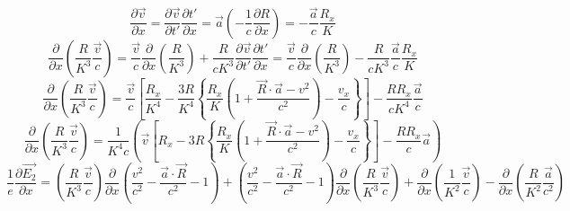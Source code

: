 \documentclass[11pt]{article}
\begin{document}
\[\frac{\partial \overrightarrow{v}}{\partial x}=\frac{\partial \overrightarrow{v}}{\partial t'}\frac{\partial t'}{\partial x}=\overrightarrow{a}\left( -\frac{1}{c}\frac{\partial R}{\partial x} \right)=-\frac{\overrightarrow{a}}{c}\frac{{{R}_{x}}}{K}\]
\[\frac{\partial }{\partial x}\left( \frac{R}{{{K}^{3}}}\frac{\overrightarrow{v}}{c} \right)=\frac{\overrightarrow{v}}{c}\frac{\partial }{\partial x}\left( \frac{R}{{{K}^{3}}} \right)+\frac{R}{c{{K}^{3}}}\frac{\partial \overrightarrow{v}}{\partial t'}\frac{\partial t'}{\partial x}=\frac{\overrightarrow{v}}{c}\frac{\partial }{\partial x}\left( \frac{R}{{{K}^{3}}} \right)-\frac{R}{c{{K}^{3}}}\frac{\overrightarrow{a}}{c}\frac{{{R}_{x}}}{K}\]
\[\frac{\partial }{\partial x}\left( \frac{R}{{{K}^{3}}}\frac{\overrightarrow{v}}{c} \right)=\frac{\overrightarrow{v}}{c}\left[ \frac{{{R}_{x}}}{{{K}^{4}}}-\frac{3R}{{{K}^{4}}}\left\{ \frac{{{R}_{x}}}{K}\left( 1+\frac{\overrightarrow{R}\cdot \overrightarrow{a}-{{v}^{2}}}{{{c}^{2}}} \right)-\frac{{{v}_{x}}}{c} \right\} \right]-\frac{R{{R}_{x}}}{c{{K}^{4}}}\frac{\overrightarrow{a}}{c}\]
\[\frac{\partial }{\partial x}\left( \frac{R}{{{K}^{3}}}\frac{\overrightarrow{v}}{c} \right)=\frac{1}{{{K}^{4}}c}\left( \overrightarrow{v}\left[ {{R}_{x}}-3R\left\{ \frac{{{R}_{x}}}{K}\left( 1+\frac{\overrightarrow{R}\cdot \overrightarrow{a}-{{v}^{2}}}{{{c}^{2}}} \right)-\frac{{{v}_{x}}}{c} \right\} \right]-\frac{R{{R}_{x}}}{c}\overrightarrow{a} \right)\]
\[\frac{1}{e}\frac{\partial \overrightarrow{{{E}_{2}}}}{\partial x}=\left( \frac{R}{{{K}^{3}}}\frac{\overrightarrow{v}}{c} \right)\frac{\partial }{\partial x}\left( \frac{{{v}^{2}}}{{{c}^{2}}}-\frac{\overrightarrow{a}\cdot \overrightarrow{R}}{{{c}^{2}}}-1 \right)+\left( \frac{{{v}^{2}}}{{{c}^{2}}}-\frac{\overrightarrow{a}\cdot \overrightarrow{R}}{{{c}^{2}}}-1 \right)\frac{\partial }{\partial x}\left( \frac{R}{{{K}^{3}}}\frac{\overrightarrow{v}}{c} \right)+\frac{\partial }{\partial x}\left( \frac{1}{{{K}^{2}}}\frac{\overrightarrow{v}}{c} \right)-\frac{\partial }{\partial x}\left( \frac{R}{{{K}^{2}}}\frac{\overrightarrow{a}}{{{c}^{2}}} \right)\]
\end{document}
